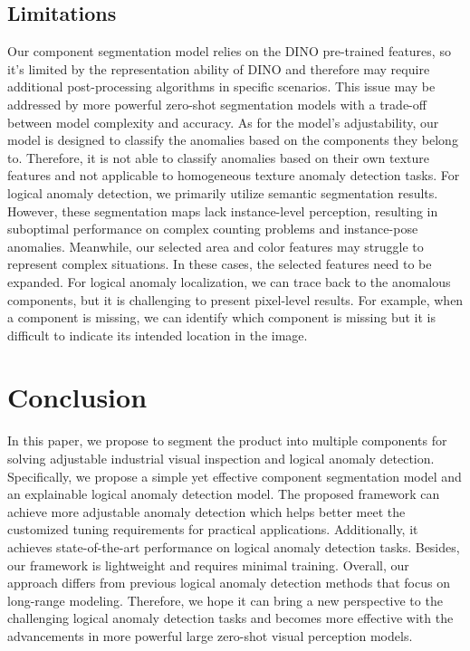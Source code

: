 \documentclass[final,5p,times,twocolumn]{elsarticle}
\begin{document}
\subsection{Limitations}
\label{5.5}
Our component segmentation model relies on the DINO pre-trained features, so it's limited by the representation ability of DINO and therefore may require additional post-processing algorithms in specific scenarios. This issue may be addressed by more powerful zero-shot segmentation models \cite{kirillov2023segment} with a trade-off between model complexity and accuracy. As for the model's adjustability, our model is designed to classify the anomalies based on the components they belong to. Therefore, it is not able to classify anomalies based on their own texture features and not applicable to homogeneous texture anomaly detection tasks. For logical anomaly detection, we primarily utilize semantic segmentation results. However, these segmentation maps lack instance-level perception, resulting in suboptimal performance on complex counting problems and instance-pose anomalies. Meanwhile, our selected area and color features may struggle to represent complex situations. In these cases, the selected features need to be expanded. For logical anomaly localization, we can trace back to the anomalous components, but it is challenging to present pixel-level results. For example, when a component is missing, we can identify which component is missing but it is difficult to indicate its intended location in the image.  

\section{Conclusion}
\label{6}
In this paper, we propose to segment the product into multiple components for solving adjustable industrial visual inspection and logical anomaly detection. Specifically, we propose a simple yet effective component segmentation model and an explainable logical anomaly detection model. The proposed framework can achieve more adjustable anomaly detection which helps better meet the customized tuning requirements for practical applications. Additionally, it achieves state-of-the-art performance on logical anomaly detection tasks. Besides, our framework is lightweight and requires minimal training. Overall, our approach differs from previous logical anomaly detection methods that focus on long-range modeling. Therefore, we hope it can bring a new perspective to the challenging logical anomaly detection tasks and becomes more effective with the advancements in more powerful large zero-shot visual perception models.  
\end{document}

